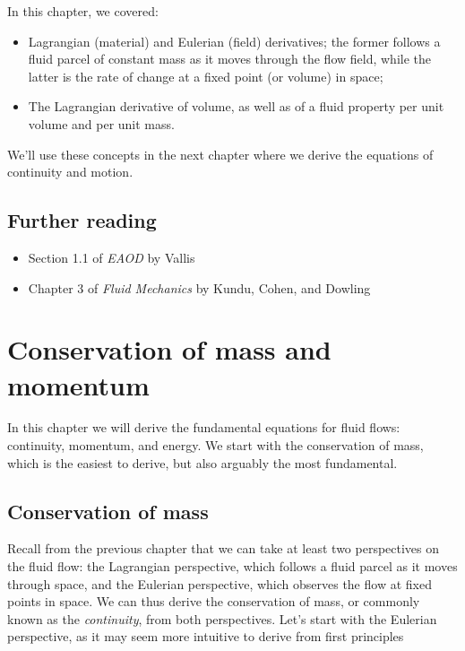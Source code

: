 \documentclass[12pt]{article}
\numberwithin{equation}{section}
\numberwithin{figure}{section}
\numberwithin{table}{section}
\begin{document}
In this chapter, we covered:

\begin{itemize}
  \item Lagrangian (material) and Eulerian (field) derivatives;
  the former follows a fluid parcel of constant mass as it moves through
  the flow field, while the latter is the rate of change at a fixed point
  (or volume) in space;
  \item The Lagrangian derivative of volume, as well as of a fluid property per
  unit volume and per unit mass.
\end{itemize}

We'll use these concepts in the next chapter where we derive the equations of
continuity and motion.

\subsection*{Further reading}

\begin{itemize}
  \item Section 1.1 of \textit{EAOD} by Vallis
  \item Chapter 3 of \textit{Fluid Mechanics} by Kundu, Cohen, and Dowling
\end{itemize}

\newpage
\section{Conservation of mass and momentum}
\label{sec:continuity_momentum}

In this chapter we will derive the fundamental equations for fluid flows:
continuity, momentum, and energy.
We start with the conservation of mass, which is the easiest to derive, but also
arguably the most fundamental.

\subsection{Conservation of mass}

Recall from the previous chapter that we can take at least two perspectives
on the fluid flow: the Lagrangian perspective, which follows a fluid parcel as it
moves through space, and the Eulerian perspective, which observes the flow at
fixed points in space.
We can thus derive the conservation of mass, or commonly known as the
\textit{continuity}, from both perspectives.
Let's start with the Eulerian perspective, as it may seem more intuitive to
derive from first principles
\end{document}

